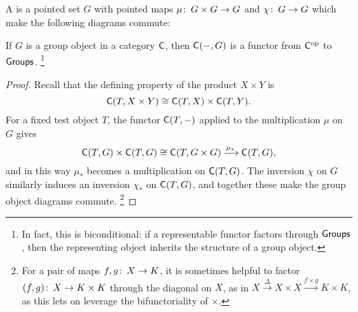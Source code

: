\begin{definition}
A  is a pointed set $G$ with pointed maps $\mu\colon\thinspace G \times G \to G$ and $\chi\colon\thinspace G \to G$ which make the following diagrams commute:
\begin{center}
\end{center}
\end{definition}

\begin{lemma}\label{RepresentableGroupsLemma}
If $G$ is a group object in a category $\mathsf{C}$, then $\mathsf{C}(-, G)$ is a functor from $\mathsf{C}^{\mathrm{op}}$ to $\mathsf{Groups}$.
\footnote{In fact, this is biconditional: if a representable functor factors through $\mathsf{Groups}$, then the representing object inherits the structure of a group object.}
\end{lemma}
\begin{proof}
Recall that the defining property of the product $X \times Y$ is \[\mathsf{C}(T, X \times Y) \cong \mathsf{C}(T, X) \times \mathsf{C}(T, Y).\]
For a fixed test object $T$, the functor $\mathsf{C}(T, -)$ applied to the multiplication $\mu$ on $G$ gives \[\mathsf{C}(T, G) \times \mathsf{C}(T, G) \cong \mathsf{C}(T, G \times G) \xrightarrow{\mu_*} \mathsf{C}(T, G),\] and in this way $\mu_*$ becomes a multiplication on $\mathsf{C}(T, G)$.
The inversion $\chi$ on $G$ similarly induces an inversion $\chi_*$ on $\mathsf{C}(T, G)$, and together these make the group object diagrams commute.
\footnote{For a pair of maps $f, g\colon\thinspace X \to K$, it is sometimes helpful to factor $(f, g)\colon\thinspace X \to K \times K$ through the diagonal on $X$, as in $X \xrightarrow\Delta X \times X \xrightarrow{f \times g} K \times K$, as this lets on leverage the bifunctoriality of $\times$.}
\end{proof}

